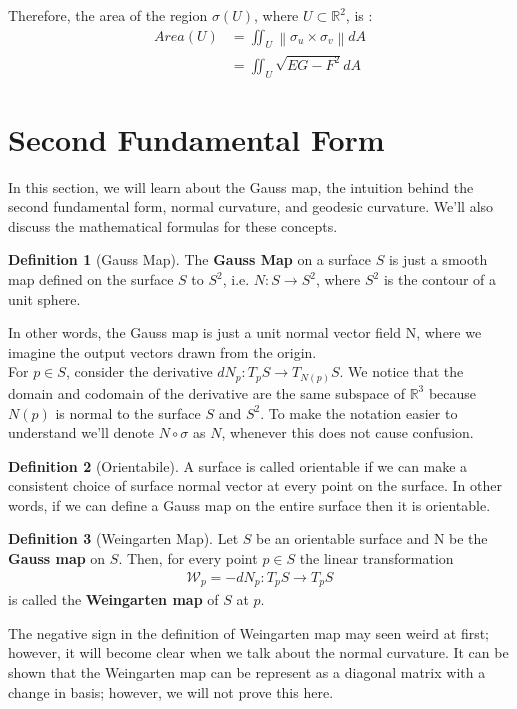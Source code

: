 \documentclass{article}
\theoremstyle{plain}
\theoremstyle{definition}
\newtheorem{definition}{Definition}
\theoremstyle{remark}
\newcommand{\R}{\mathbb{R}}
\begin{document}
Therefore, the area of the region \( \sigma(U) \), where \( U \subset \R^2 \), is :
\begin{align*}
    Area(U) & = \iint_U \left\lVert \sigma_u \times \sigma_v \right\rVert dA \\
            & = \iint_U \sqrt{EG - F^2} dA
\end{align*}

\section{Second Fundamental Form}
In this section, we will learn about the Gauss map, the intuition behind the second fundamental form, normal curvature, and geodesic curvature. We'll also discuss the mathematical formulas for these concepts.

\begin{definition}[Gauss Map]
    The \textbf{Gauss Map} on a surface \(S\) is just a smooth map defined on the surface \(S\) to \(S^2\), i.e. \( N: S \rightarrow S^2 \), where \( S^2\) is the contour of a unit sphere.
\end{definition}
In other words, the Gauss map is just a unit normal vector field N, where we imagine the output vectors drawn from the origin.\\
For \( p \in S\), consider the derivative \(dN_p: T_pS \rightarrow T_{N(p)}S \). We notice that the domain and codomain of the derivative are the same subspace of \( \R^3\) because \(N(p)\) is normal to the surface \(S\) and \(S^2\). To make the notation easier to understand we'll denote \(N \circ \sigma\) as \(N\), whenever this does not cause confusion.

\begin{definition}[Orientabile]
    A surface is called orientable if we can make a consistent choice of surface normal vector at every point on the surface. In other words, if we can define a Gauss map on the entire surface then it is orientable.
\end{definition}
\begin{definition}[Weingarten Map]
    Let \(S\) be an orientable surface and N be the \textbf{Gauss map} on \(S\). Then, for every point \(p \in S \) the linear transformation
    \begin{align*}
        \mathcal{W}_p = -dN_p: T_pS \rightarrow T_pS
    \end{align*}
    is called the \textbf{Weingarten map} of \(S\) at \(p\).
\end{definition}
The negative sign in the definition of Weingarten map may seen weird at first; however, it will become clear when we talk about the normal curvature. It can be shown that the Weingarten map can be represent as a diagonal matrix with a change in basis; however, we will not prove this here.
\end{document}
